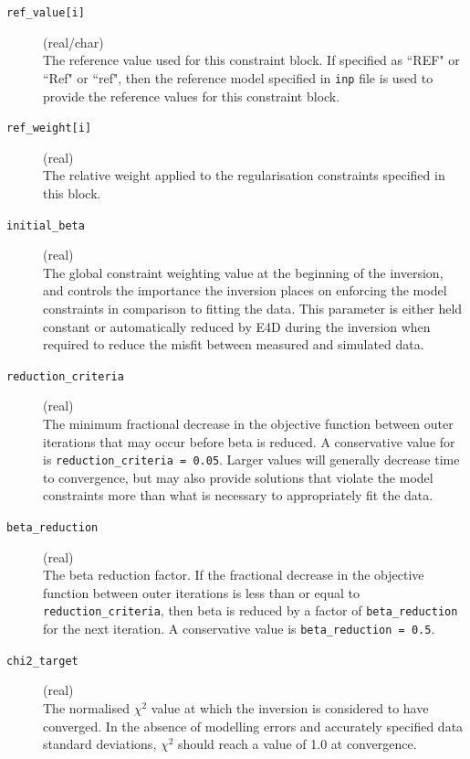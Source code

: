 \documentclass[a4paper,12pt]{article}
\begin{document}
\begin{description}
    \item[\texttt{ref\_value[i]}] (real/char)\hfill \\
     The reference value used for this constraint block. If specified as ``REF" or ``Ref" or ``ref", then the reference model specified in \texttt{inp} file is used to provide the reference values for this constraint block.

     \item[\texttt{ref\_weight[i]}] (real)\hfill \\
     The relative weight applied to the regularisation constraints specified in this block.

     \item[\texttt{initial\_beta}] (real)\hfill \\
     The global constraint weighting value at the beginning of the inversion, and controls the importance the inversion places on enforcing the model constraints in comparison to fitting the data. This parameter is either held constant or automatically reduced by E4D during the inversion when required to reduce the misfit between measured and simulated data.

    \item[\texttt{reduction\_criteria}] (real)\hfill \\
     The minimum fractional decrease in the objective function between outer iterations that may occur before beta is reduced. A conservative value for is \texttt{reduction\_criteria = 0.05}. Larger values will generally decrease time to convergence, but may also provide solutions that violate the model constraints more than what is necessary to appropriately fit the data.

     \item[\texttt{beta\_reduction}] (real)\hfill \\
     The beta reduction factor. If the fractional decrease in the objective function between outer iterations is less than or equal to \texttt{reduction\_criteria}, then beta is reduced by a factor of \texttt{beta\_reduction} for the next iteration. A conservative value is \texttt{beta\_reduction = 0.5}.

     \item[\texttt{chi2\_target}] (real)\hfill \\
     The normalised $\chi^2$ value at which the inversion is considered to have converged. In the absence of modelling errors and accurately specified data standard deviations, $\chi^2$ should reach a value of 1.0 at convergence.


\end{description}
\end{document}
